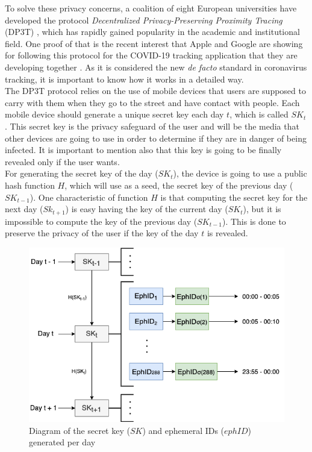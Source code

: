 \documentclass[a4paper, 12pt]{article}
\begin{document}
To solve these privacy concerns, a coalition of eight European universities have developed the protocol \textit{Decentralized Privacy-Preserving Proximity Tracing} (DP3T) \cite{dp3t-docs}, which has rapidly gained popularity in the academic and institutional field. One proof of that is the recent interest that Apple and Google are showing for following this protocol for the COVID-19 tracking application that they are developing together \cite{dp3t-google-apple}. As it is considered the new \textit{de facto} standard in coronavirus tracking, it is important to know how it works in a detailed way.\\

The DP3T protocol relies on the use of mobile devices that users are supposed to carry with them when they go to the street and have contact with people. Each mobile device should generate a unique secret key each day $t$, which is called $SK_t$. This secret key is the privacy safeguard of the user and will be the media that other devices are going to use in order to determine if they are in danger of being infected. It is important to mention also that this key is going to be finally revealed only if the user wants. \\

For generating the secret key of the day ($SK_t$), the device is going to use a public hash function $H$, which will use as a seed, the secret key of the previous day ($SK_{t-1}$). One characteristic of function $H$ is that computing the secret key for the next day ($Sk_{t+1}$) is easy having the key of the current day ($SK_t$), but it is impossible to compute the key of the previous day ($SK_{t-1}$). This is done to preserve the privacy of the user if the key of the day $t$ is revealed. \\

\begin{figure}[h]
    \centering
    \includegraphics[scale=0.4]{images/discussion/SK-ids-diagram.png}
    \caption{Diagram of the secret key ($SK$) and ephemeral IDs ($ephID$) generated per day}
    \label{fig:sk-diagram}
\end{figure}
\end{document}
